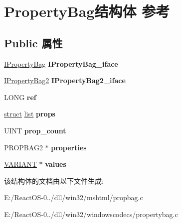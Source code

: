 \hypertarget{struct_property_bag}{}\section{Property\+Bag结构体 参考}
\label{struct_property_bag}
\subsection*{Public 属性}
\begin{DoxyCompactItemize}
\item 
\mbox{\label{struct_property_bag_addb2aea6e4706a66e015a94a1074c184}} 
\hyperlink{interface_i_property_bag}{I\+Property\+Bag} {\bfseries I\+Property\+Bag\+\_\+iface}
\item 
\mbox{\label{struct_property_bag_aad7956f4c715fa48c57a5d9adefa895d}} 
\hyperlink{interface_i_property_bag2}{I\+Property\+Bag2} {\bfseries I\+Property\+Bag2\+\_\+iface}
\item 
\mbox{\label{struct_property_bag_a5b95656c30cc2946afe7d49f7880e360}} 
L\+O\+NG {\bfseries ref}
\item 
\mbox{\label{struct_property_bag_a29c91d7fecfbf4103dd9328841bc2c7b}} 
\hyperlink{interfacestruct}{struct} \hyperlink{classlist}{list} {\bfseries props}
\item 
\mbox{\label{struct_property_bag_a54b42e6560fe363fa34652e474072269}} 
U\+I\+NT {\bfseries prop\+\_\+count}
\item 
\mbox{\label{struct_property_bag_a0b7c9f3942223a3a0a697affa28e0316}} 
P\+R\+O\+P\+B\+A\+G2 $\ast$ {\bfseries properties}
\item 
\mbox{\label{struct_property_bag_a520e441dda3cf7e8068fa7bf706f73f5}} 
\hyperlink{structtag_v_a_r_i_a_n_t}{V\+A\+R\+I\+A\+NT} $\ast$ {\bfseries values}
\end{DoxyCompactItemize}


该结构体的文档由以下文件生成\+:\begin{DoxyCompactItemize}
\item 
E\+:/\+React\+O\+S-\/0../dll/win32/mshtml/propbag.\+c\item 
E\+:/\+React\+O\+S-\/0../dll/win32/windowscodecs/propertybag.\+c\end{DoxyCompactItemize}
